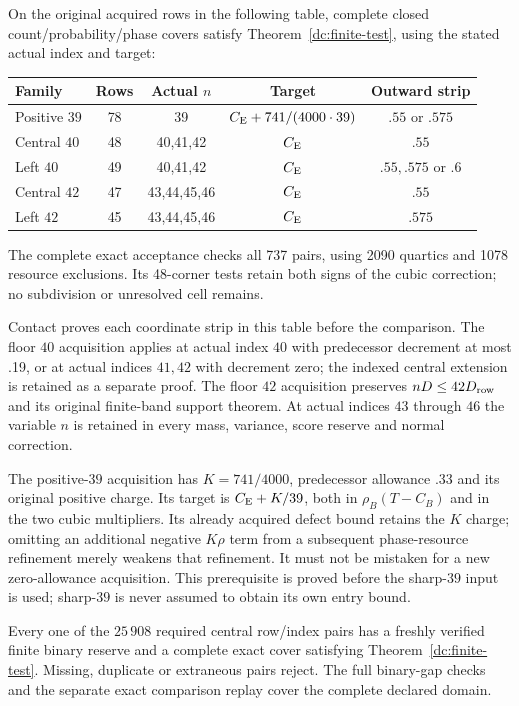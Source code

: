 \begin{proposition}
\label{j:local:direct-finite-numerical}
\label{dc:earlier-numerical}
On the original acquired rows in the following table, complete closed
count/probability/phase covers satisfy Theorem~\ref{dc:finite-test}, using
the stated actual index and target:
\begin{center}
\begin{tabular}{lcccc}\toprule
Family&Rows&Actual $n$&Target&Outward strip\\\midrule
Positive $39$&78&39&$C_{\mathrm E}+741/(4000\cdot39)$&$.55$ or $.575$\\
Central $40$&48&40,41,42&$C_{\mathrm E}$&$.55$\\
Left $40$&49&40,41,42&$C_{\mathrm E}$&$.55,.575$ or $.6$\\
Central $42$&47&43,44,45,46&$C_{\mathrm E}$&$.55$\\
Left $42$&45&43,44,45,46&$C_{\mathrm E}$&$.575$\\\bottomrule
\end{tabular}
\end{center}
The complete exact acceptance checks all 737 pairs, using 2090 quartics
and 1078 resource exclusions. Its 48-corner tests retain both signs of
the cubic correction; no subdivision or unresolved cell remains.
\end{proposition}

Contact proves each coordinate strip in this table before the comparison. The floor $40$
acquisition applies at actual index $40$ with predecessor decrement at most .19,
or at actual indices $41,42$ with decrement zero; the indexed central extension is
retained as a separate proof. The floor $42$ acquisition preserves
$nD\le42D_{\rm row}$ and its original finite-band support theorem.
At actual indices $43$ through $46$ the variable $n$ is retained in every mass, variance,
score reserve and normal correction.

The positive-$39$ acquisition has $K=741/4000$, predecessor allowance .33
and its original positive charge. Its target is $C_{\mathrm E}+K/39$, both in
$\rho_B(T-C_B)$ and in the two cubic multipliers. Its already acquired
defect bound retains the $K$ charge; omitting an additional negative
$K\rho$ term from a subsequent phase-resource refinement merely weakens
that refinement. It must not be mistaken for a new zero-allowance
acquisition. This prerequisite is proved before the sharp-$39$ input is
used; sharp-$39$ is never assumed to obtain its own entry bound.

\begin{proposition}
\label{dc:central-numerical}
Every one of the $25\,908$ required central row/index pairs has a freshly
verified finite binary reserve and a complete exact cover satisfying
Theorem~\ref{dc:finite-test}. Missing, duplicate or extraneous pairs
reject. The full binary-gap checks and the separate exact comparison
replay cover the complete declared domain.
\end{proposition}


